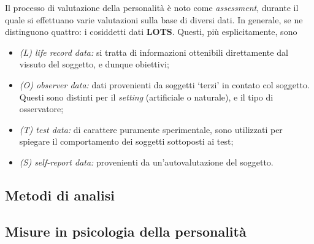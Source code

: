 \documentclass{subfiles}
\begin{document}
Il processo di valutazione della personalità è noto come \emph{assessment}, durante il quale si effettuano varie valutazioni sulla base di diversi dati.
In generale, se ne distinguono quattro: i cosiddetti dati \textbf{LOTS}.
Questi, più esplicitamente, sono
\begin{itemize}
    \item \emph{(L) life record data:} si tratta di informazioni ottenibili direttamente dal vissuto del soggetto, e dunque obiettivi;
    \item \emph{(O) observer data:} dati provenienti da soggetti `terzi' in contato col soggetto.
          Questi sono distinti per il \emph{setting} (artificiale o naturale), e il tipo di osservatore;
    \item \emph{(T) test data:} di carattere puramente sperimentale, sono utilizzati per spiegare il comportamento dei soggetti sottoposti ai test;
    \item \emph{(S) self-report data:} provenienti da un'autovalutazione del soggetto.
\end{itemize}

\subsection{Metodi di analisi}


\subsection{Misure in psicologia della personalità}

\end{document}

